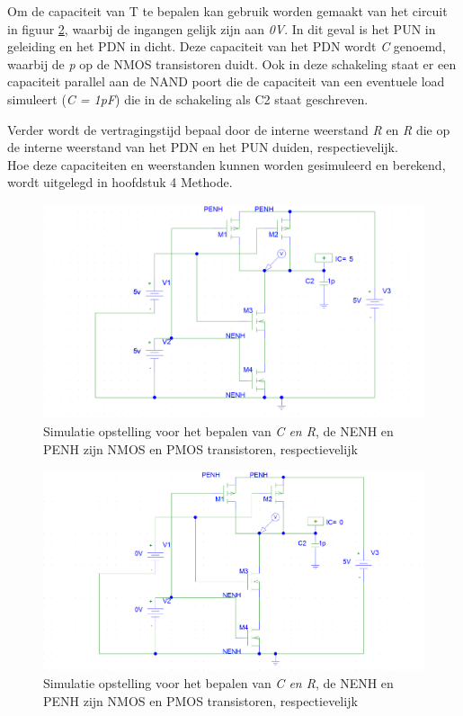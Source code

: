 \documentclass{article}
\begin{document}
Om de capaciteit van T te bepalen kan gebruik worden gemaakt van het circuit in figuur \ref{res:PUN_schakeling}, waarbij de ingangen gelijk zijn aan \emph{0V}. In dit geval is het PUN in geleiding en het PDN in dicht. Deze capaciteit van het PDN wordt \emph{C} genoemd, waarbij de \emph{p} op de NMOS transistoren duidt. Ook in deze schakeling staat er een capaciteit parallel aan de NAND poort die de capaciteit van een eventuele load simuleert (\emph{C = 1pF}) die in de schakeling als C2 staat geschreven.

Verder wordt de vertragingstijd bepaal door de interne weerstand \emph{R} en \emph{R} die op de interne weerstand van het PDN en het PUN duiden, respectievelijk.\\

Hoe deze capaciteiten en weerstanden kunnen worden gesimuleerd en berekend, wordt uitgelegd in hoofdstuk 4 Methode.

 \begin{figure} [h!]
 \begin{center}
 \includegraphics [scale = 0.4] {figures/PDN}
 \caption{Simulatie opstelling voor het bepalen van \emph{C en R}, de NENH en PENH zijn NMOS en PMOS transistoren, respectievelijk}
 \label{res:PDN_schakeling}
 \end{center}
 \end{figure}

 \begin{figure} [h!]
 \begin{center}
 \includegraphics [scale = 0.4] {figures/PUN}
 \caption{Simulatie opstelling voor het bepalen van \emph{C en R}, de NENH en PENH zijn NMOS en PMOS transistoren, respectievelijk}
 \label{res:PUN_schakeling}
 \end{center}
 \end{figure}
\end{document}
